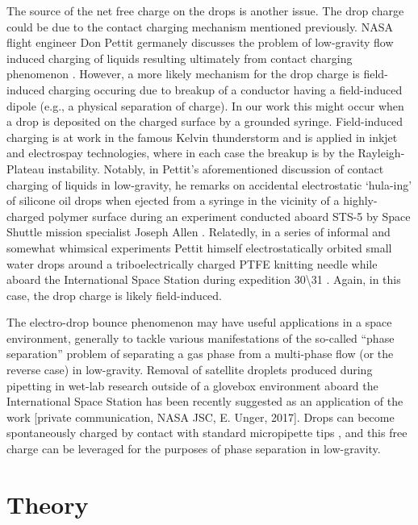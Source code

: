 \documentclass[aip,reprint, floatfix]{revtex4-1}
\begin{document}
The source of the net free charge on the drops is another issue. The drop charge could be due to the contact charging mechanism mentioned previously. NASA flight engineer Don Pettit germanely discusses the problem of low-gravity flow induced charging of liquids resulting ultimately from contact charging phenomenon \cite{pettit_donald_flow_????}. However, a more likely mechanism for the drop charge is field-induced charging occuring due to breakup of a conductor having a field-induced dipole (e.g., a physical separation of charge). In our work this might occur when a drop is deposited on the charged surface by a grounded syringe. Field-induced charging is at work in the famous Kelvin thunderstorm and is applied in inkjet and electrospay technologies, where in each case the breakup is by the Rayleigh-Plateau instability. Notably, in Pettit's aforementioned discussion of contact charging of liquids in low-gravity, he remarks on accidental electrostatic `hula-ing' of silicone oil drops when ejected from a syringe in the vicinity of a highly-charged polymer surface during an experiment conducted aboard STS-5 by Space Shuttle mission specialist Joseph Allen \cite{pettit_donald_flow_????}. Relatedly, in a series of informal and somewhat whimsical experiments Pettit himself electrostatically orbited small water drops around a triboelectrically charged PTFE knitting needle while aboard the International Space Station during expedition 30\textbackslash 31 \cite{stevenson_electrostatic_2015}. Again, in this case, the drop charge is likely field-induced.

The electro-drop bounce phenomenon may have useful applications in a space environment, generally to tackle various manifestations of the so-called ``phase separation'' problem of separating a gas phase from a multi-phase flow (or the reverse case) in low-gravity. Removal of satellite droplets produced during pipetting in wet-lab research outside of a glovebox environment aboard the International Space Station  has been recently suggested as an application of the work [private communication, NASA JSC, E. Unger, 2017]. Drops can become spontaneously charged by contact with standard micropipette tips \citep{choi_spontaneous_2013}, and this free charge can be leveraged for the purposes of phase separation in low-gravity.

\section{Theory}
\end{document}

